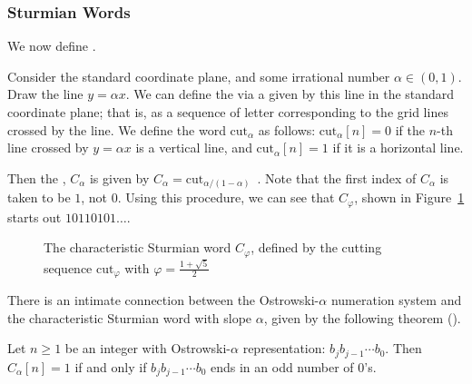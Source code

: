 \subsubsection{Sturmian Words}

We now define .

Consider the standard coordinate plane, and some irrational number $\alpha \in (0,1)$.
Draw the line $y = \alpha x$.
We can define the  via a  given by this line in the standard coordinate plane; that is, as a sequence of letter corresponding to the grid lines crossed by the line.
We define the word $\text{cut}_{\alpha}$ as follows:
$\text{cut}_{\alpha}[n] = 0$ if the $n$-th line crossed by $y = \alpha x$ is a vertical line, and $\text{cut}_{\alpha}[n] = 1$ if it is a horizontal line.

Then the , $C_{\alpha}$ is given by $C_{\alpha} = \text{cut}_{\alpha/(1-\alpha)}$~\autocite[Theorem 9.2.1]{auto_seq}.
Note that the first index of $C_{\alpha}$ is taken to be $1$, not $0$.
Using this procedure, we can see that $C_{\varphi}$, shown in Figure~\ref{fig:geom-sturmian-phi} starts out $10110101\ldots$.

\begin{figure}
    \centering
    \caption{The characteristic Sturmian word $C_{\varphi}$, defined by the cutting sequence $\text{cut}_{\varphi}$ with $\varphi = \frac{1 + \sqrt{5}}{2}$}
    \label{fig:geom-sturmian-phi}
\end{figure}

There is an intimate connection between the Ostrowski-$\alpha$ numeration system and the characteristic Sturmian word with slope $\alpha$, given by the following theorem (\autocite[Theorem 9.1.15]{auto_seq}).

\begin{theorem}\label{thm:ostrowski-sturmian}
Let $n \geq 1$ be an integer with Ostrowski-$\alpha$ representation: $b_j b_{j-1} \cdots b_0$.
Then $C_{\alpha}[n] = 1$ if and only if $b_j b_{j-1} \cdots b_0$ ends in an odd number of $0$'s.
\end{theorem}

